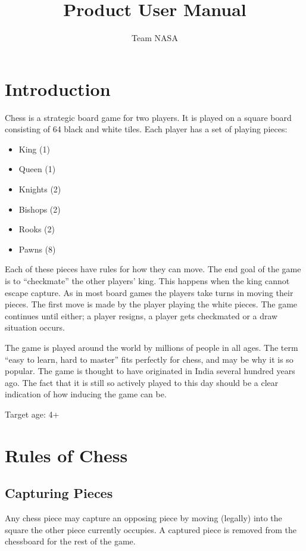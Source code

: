 \documentclass[12pt, a4paper]{article}
\title{Product User Manual}
\author{Team NASA}
\date{}
\begin{document}
\maketitle

\tableofcontents
\pagebreak

\section{Introduction}
Chess is a strategic board game for two players. It is played on a square board consisting of 64 black and white tiles. Each player has a set of playing pieces:
\begin{itemize}
\item King (1)
\item Queen (1)
\item Knights (2)
\item Bishops (2)
\item Rooks (2)
\item Pawns (8)
\end{itemize}

Each of these pieces have rules for how they can move. The end goal of the game is to “checkmate” the other players’ king. This happens when the king cannot escape capture. As in most board games the players take turns in moving their pieces. The first move is made by the player playing the white pieces. The game continues until either; a player resigns, a player gets checkmated or a draw situation occurs.

The game is played around the world by millions of people in all ages. The term “easy to learn, hard to master” fits perfectly for chess, and may be why it is so popular. The game is thought to have originated in India several hundred years ago. The fact that it is still so actively played to this day should be a clear indication of how inducing the game can be.

Target age: 4+

\section{Rules of Chess}

\subsection{Capturing Pieces}
Any chess piece may capture an opposing piece by moving (legally) into the square the other piece currently occupies. A captured piece is removed from the chessboard for the rest of the game.
\end{document}

